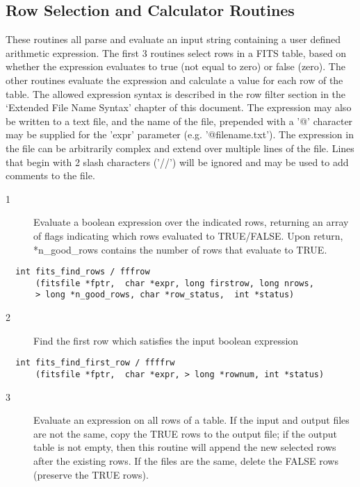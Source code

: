\documentclass[11pt]{book}
\begin{document}
\subsection{Row Selection and Calculator Routines}

These routines all parse and evaluate an input string containing a user
defined arithmetic expression.  The first 3 routines select rows in a
FITS table, based on whether the expression evaluates to true (not
equal to zero) or false (zero).  The other routines evaluate the
expression and calculate a value for each row of the table.  The
allowed expression syntax is described in the row filter section in the
`Extended File Name Syntax' chapter of this document.  The expression
may also be written to a text file, and the name of the file, prepended
with a '@' character may be supplied for the 'expr' parameter (e.g.
'@filename.txt'). The  expression  in  the  file can be arbitrarily
complex and extend over multiple lines of the file.  Lines  that begin
with 2 slash characters ('//') will  be ignored and may be used to add
comments to the file.


\begin{description}
\item[1 ] Evaluate a boolean expression over the indicated rows, returning an
 array of flags indicating which rows evaluated to TRUE/FALSE.
 Upon return,
 *n\_good\_rows contains the number of rows that evaluate to TRUE. \label{fffrow}
\end{description}

\begin{verbatim}
  int fits_find_rows / fffrow
      (fitsfile *fptr,  char *expr, long firstrow, long nrows,
      > long *n_good_rows, char *row_status,  int *status)
\end{verbatim}

\begin{description}
\item[2 ] Find the first row which satisfies the input boolean expression \label{ffffrw}
\end{description}

\begin{verbatim}
  int fits_find_first_row / ffffrw
      (fitsfile *fptr,  char *expr, > long *rownum, int *status)
\end{verbatim}

\begin{description}
\item[3 ]Evaluate an expression on all rows of a table.  If the input and output
files are not the same, copy the TRUE rows to the output file; if the output
table is not empty, then this routine will append the new
selected rows after the existing rows.   If the
files are the same, delete the FALSE rows (preserve the TRUE rows). \label{ffsrow}
\end{description}
\end{document}
